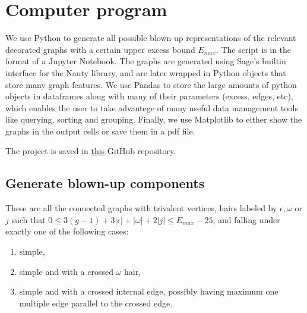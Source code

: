\section{Computer program}


\newcommand{\myB}{\bGK^{12,1}}

We use Python to generate all possible blown-up representations of the relevant decorated graphs with a certain upper excess bound $E_{max}$. The script is in the format of a Jupyter Notebook. The graphs are generated using Sage's builtin interface for the Nauty library, and are later wrapped in Python objects that store many graph features. We use Pandas to store the large amounts of python objects in dataframes along with many of their parameters (excess, edges, etc), which enables the user to take advantege of many useful data management tools like querying, sorting and grouping. Finally, we use Matplotlib to either show the graphs in the output cells or save them in a pdf file.

The project is saved in \href{https://github.com/bellimarco/Getzler-Kapranov-Graph-Cohomology-Computations-in-weight-13}{this} GitHub repository.

\subsection{Generate blown-up components} These are all the connected graphs with trivalent vertices, hairs labeled by $\epsilon,\omega$ or $j$ such that $0\leq 3(g-1)+3|\epsilon|+|\omega|+2|j| \leq E_{max}-25$, and falling under exactly one of the following cases:
\begin{enumerate}
    \item simple,
    \item simple and with a crossed $\omega$ hair,
    \item simple and with a crossed internal edge, possibly having maximum one multiple edge parallel to the crossed edge.
\end{enumerate}

